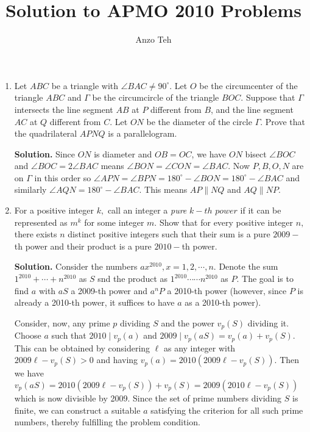 \documentclass[11pt,a4paper]{article}
\begin{document}
\newcommand{\la}{\leftarrow}
\newcommand{\lra}{\leftrightarrow}
\newcommand{\bbN}{\mathbb{N}}
\newcommand{\bbZ}{\mathbb{Z}}
\newcommand{\dsum}{\displaystyle\sum}
\newcommand{\dprod}{\displaystyle\prod}


\title{Solution to APMO 2010 Problems}
\author{Anzo Teh}
\date{}
\maketitle

\begin{enumerate}
	\item Let $ABC$ be a triangle with $\angle BAC \neq 90^{\circ}.$ Let $O$ be the circumcenter of the triangle $ABC$ and $\Gamma$ be the circumcircle of the triangle $BOC.$ Suppose that $\Gamma$ intersects the line segment $AB$ at $P$ different from $B$, and the line segment $AC$ at $Q$ different from $C.$ Let $ON$ be the diameter of the circle $\Gamma.$ Prove that the quadrilateral $APNQ$ is a parallelogram.
	
	\textbf{Solution.} Since $ON$ is diameter and $OB=OC$, we have $ON$ bisect $\angle BOC$ and $\angle BOC=2\angle BAC$ means $\angle BON=\angle CON=\angle BAC$. Now $P, B, O, N$ are on $\Gamma$ in this order so $\angle APN=\angle BPN=180^{\circ}-\angle BON=180^{\circ}-\angle BAC$ and similarly $\angle AQN=180^{\circ}-\angle BAC$. This means $AP\parallel NQ$ and $AQ\parallel NP$. 
	
	\item For a positive integer $k,$ call an integer a \emph{pure} $k-th$ $power$ if it can be represented as $m^k$ for some integer $m.$ Show that for every positive integer $n,$ there exists $n$ distinct positive integers such that their sum is a pure $2009-$th power and their product is a pure $2010-$th power.
	
	\textbf{Solution.} Consider the numbers $ax^{2010}, x=1, 2, \cdots, n$. Denote the sum $1^{2010}+\cdots +n^{2010}$ as $S$ snd the product as $1^{2010}\cdots \cdots n^{2010}$ as $P$. The goal is to find $a$ with $aS$ a 2009-th power and $a^{n}P$ a 2010-th power (however, since $P$ is already a 2010-th power, it suffices to have $a$ as a 2010-th power). 
	
	Consider, now, any prime $p$ dividing $S$ and the power $v_p(S)$ dividing it. Choose $a$ such that $2010\mid v_p(a)$ and $2009\mid v_p(aS)=v_p(a)+v_p(S)$. This can be obtained by considering $\ell$ as any integer with $2009\ell-v_p(S)>0$ and having $v_p(a)=2010(2009\ell-v_p(S))$. 
	Then we have $v_p(aS)=2010(2009\ell-v_p(S))+v_p(S)=2009(2010\ell - v_p(S))$ which is now divisible by 2009. 
	Since the set of prime numbers dividing $S$ is finite, we can construct a suitable $a$ satisfying the criterion for all such prime numbers, thereby fulfilling the problem condition. 
	

\end{enumerate}
\end{document}

